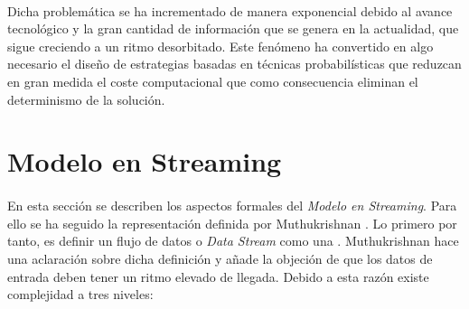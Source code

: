\documentclass{subfiles}
\begin{document}
        \paragraph{}
        Dicha problemática se ha incrementado de manera exponencial debido al avance tecnológico y la gran cantidad de información que se genera en la actualidad, que sigue creciendo a un ritmo desorbitado. Este fenómeno ha convertido en algo necesario el diseño de estrategias basadas en técnicas probabilísticas que reduzcan en gran medida el coste computacional que como consecuencia eliminan el determinismo de la solución.


    \section{Modelo en Streaming}
    \label{sec:streaming_model}

      \paragraph{}
      En esta sección se describen los aspectos formales del \emph{Modelo en Streaming}. Para ello se ha seguido la representación definida por Muthukrishnan \cite{Muthukrishnan:2005:DSA:1166409.1166410}. Lo primero por tanto, es definir un flujo de datos o \emph{Data Stream} como una  \cite{ITS-def-data-stream}. Muthukrishnan \cite{Muthukrishnan:2005:DSA:1166409.1166410} hace una aclaración sobre dicha definición y añade la objeción de que los datos de entrada deben tener un ritmo elevado de llegada. Debido a esta razón existe complejidad a tres niveles:
\end{document}
